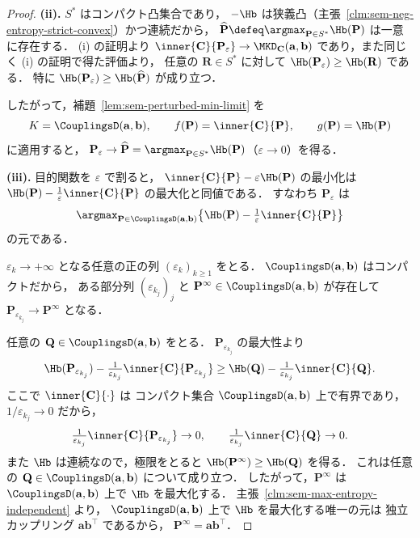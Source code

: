 \begin{proof}
  \textbf{(ii).}
  $S^*$ はコンパクト凸集合であり，
  $-\Hb$ は狭義凸（主張~\ref{clm:sem-neg-entropy-strict-convex}）かつ連続だから，
  $\widehat{\mathbf{P}} \defeq \argmax_{\mathbf{P} \in S^*}\Hb(\mathbf{P})$
  は一意に存在する．
  (i) の証明より
  $\inner{\mathbf{C}}{\mathbf{P}_\varepsilon} \to \MKD_{\mathbf{C}}(\mathbf{a},\mathbf{b})$
  であり，また同じく (i) の証明で得た評価より，
  任意の $\mathbf{R} \in S^*$ に対して
  $\Hb(\mathbf{P}_\varepsilon) \geq \Hb(\mathbf{R})$ である．
  特に $\Hb(\mathbf{P}_\varepsilon) \geq \Hb(\widehat{\mathbf{P}})$ が成り立つ．

  したがって，補題~\ref{lem:sem-perturbed-min-limit} を
  \[
    K = \CouplingsD(\mathbf{a},\mathbf{b}),\qquad
    f(\mathbf{P}) = \inner{\mathbf{C}}{\mathbf{P}},\qquad
    g(\mathbf{P}) = \Hb(\mathbf{P})
  \]
  に適用すると，
  $\mathbf{P}_\varepsilon \to \widehat{\mathbf{P}}
  = \argmax_{\mathbf{P} \in S^*} \Hb(\mathbf{P})$（$\varepsilon \to 0$）を得る．

  \textbf{(iii).}
  目的関数を $\varepsilon$ で割ると，
  $\inner{\mathbf{C}}{\mathbf{P}} - \varepsilon\Hb(\mathbf{P})$ の最小化は
  $\Hb(\mathbf{P}) - \tfrac{1}{\varepsilon}\inner{\mathbf{C}}{\mathbf{P}}$
  の最大化と同値である．
  すなわち $\mathbf{P}_\varepsilon$ は
  \[
    \argmax_{\mathbf{P} \in \CouplingsD(\mathbf{a},\mathbf{b})}
    \bigl\{\Hb(\mathbf{P})
    - \tfrac{1}{\varepsilon}\inner{\mathbf{C}}{\mathbf{P}}\bigr\}
  \]
  の元である．

  $\varepsilon_k \to +\infty$ となる任意の正の列 $(\varepsilon_k)_{k \geq 1}$ をとる．
  $\CouplingsD(\mathbf{a},\mathbf{b})$ はコンパクトだから，
  ある部分列 $(\varepsilon_{k_j})_j$ と
  $\mathbf{P}^\infty \in \CouplingsD(\mathbf{a},\mathbf{b})$ が存在して
  $\mathbf{P}_{\varepsilon_{k_j}} \to \mathbf{P}^\infty$ となる．

  任意の $\mathbf{Q} \in \CouplingsD(\mathbf{a},\mathbf{b})$ をとる．
  $\mathbf{P}_{\varepsilon_{k_j}}$ の最大性より
  \[
    \Hb(\mathbf{P}_{\varepsilon_{k_j}})
    - \tfrac{1}{\varepsilon_{k_j}}\inner{\mathbf{C}}{\mathbf{P}_{\varepsilon_{k_j}}}
    \geq
    \Hb(\mathbf{Q})
    - \tfrac{1}{\varepsilon_{k_j}}\inner{\mathbf{C}}{\mathbf{Q}}.
  \]
  ここで $\inner{\mathbf{C}}{\cdot}$ は
  コンパクト集合 $\CouplingsD(\mathbf{a},\mathbf{b})$ 上で有界であり，
  $1/\varepsilon_{k_j} \to 0$ だから，
  \[
    \tfrac{1}{\varepsilon_{k_j}}\inner{\mathbf{C}}{\mathbf{P}_{\varepsilon_{k_j}}} \to 0,
    \qquad
    \tfrac{1}{\varepsilon_{k_j}}\inner{\mathbf{C}}{\mathbf{Q}} \to 0.
  \]
  また $\Hb$ は連続なので，極限をとると
  $\Hb(\mathbf{P}^\infty) \geq \Hb(\mathbf{Q})$ を得る．
  これは任意の $\mathbf{Q} \in \CouplingsD(\mathbf{a},\mathbf{b})$
  について成り立つ．
  したがって，$\mathbf{P}^\infty$ は
  $\CouplingsD(\mathbf{a},\mathbf{b})$ 上で $\Hb$ を最大化する．
  主張~\ref{clm:sem-max-entropy-independent} より，
  $\CouplingsD(\mathbf{a},\mathbf{b})$ 上で $\Hb$ を最大化する唯一の元は
  独立カップリング $\mathbf{a}\mathbf{b}^\top$ であるから，
  $\mathbf{P}^\infty = \mathbf{a}\mathbf{b}^\top$．


\end{proof}
